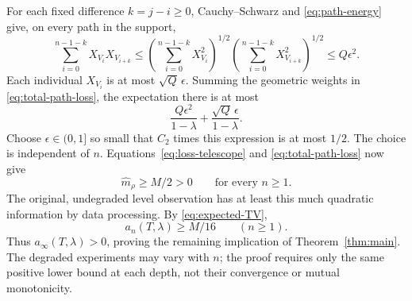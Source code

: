 \documentclass[11pt]{article}
\numberwithin{equation}{section}
\begin{document}
For each fixed difference $k=j-i\geq0$, Cauchy--Schwarz and
\eqref{eq:path-energy} give, on every path in the support,
\[
 \sum_{i=0}^{n-1-k}X_{V_i}X_{V_{i+k}}
 \leq
 \left(\sum_{i=0}^{n-1-k}X_{V_i}^2\right)^{1/2}
 \left(\sum_{i=0}^{n-1-k}X_{V_{i+k}}^2\right)^{1/2}
 \leq Q\epsilon^2.
\]
Each individual $X_{V_i}$ is at most $\sqrt Q\,\epsilon$.
Summing the geometric weights in \eqref{eq:total-path-loss},
the expectation there is at most
\begin{equation}\label{eq:uniform-loss-bound}
 \frac{Q\epsilon^2}{1-\lambda}
       +\frac{\sqrt Q\,\epsilon}{1-\lambda}.
\end{equation}
Choose $\epsilon\in(0,1]$ so small that $C_2$ times this
expression is at most $1/2$. The choice is independent of $n$.
Equations~\eqref{eq:loss-telescope} and
\eqref{eq:total-path-loss} now give
\[
 \widehat m_\rho\geq M/2>0\qquad\text{for every }n\geq1.
\]
The original, undegraded level observation has at least this
much quadratic information by data processing. By
\eqref{eq:expected-TV},
\[
 a_n(T,\lambda)\geq M/16\qquad(n\geq1).
\]
Thus $a_\infty(T,\lambda)>0$, proving the remaining implication
of Theorem~\ref{thm:main}. The degraded experiments may vary with
$n$; the proof requires only the same positive lower bound at
each depth, not their convergence or mutual monotonicity.



\end{document}
